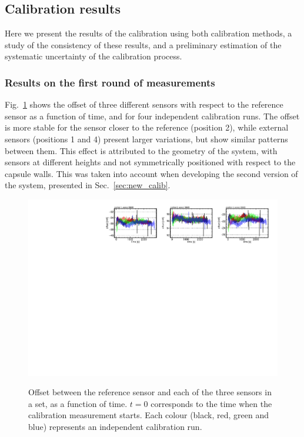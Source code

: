 
\subsection{Calibration results}
\label{sec:calib_results}
\noindent Here we present the results of the calibration using both calibration methods, a study of the consistency of these results, and a preliminary estimation of the systematic uncertainty of the calibration process.

\subsubsection{Results on the first round of measurements}
\noindent Fig.~\ref{fi:CAL_offset_example} shows the offset of three different sensors with respect to the reference sensor as a function of time, and for four independent calibration runs. The offset is more stable for the sensor closer to the reference (position 2), while external sensors (positions 1 and 4) present larger variations, but show similar patterns between them. This effect is attributed to the geometry of the system, with sensors at different heights and not symmetrically positioned with respect to the capsule walls. This was taken into account when developing the second version of the system, presented in Sec.~\ref{sec:new_calib}.

\label{sec:results_first_round}
\begin{figure}[htbp]
\centering
{\includegraphics[width=\textwidth]{./figure_10.pdf}}
\caption{Offset between the reference sensor and each of the three sensors in a set, as a function of time. $t=0$ corresponds to the time when the calibration measurement starts. Each colour (black, red, green and blue) represents an independent calibration run.}
\label{fi:CAL_offset_example}
\end{figure}

